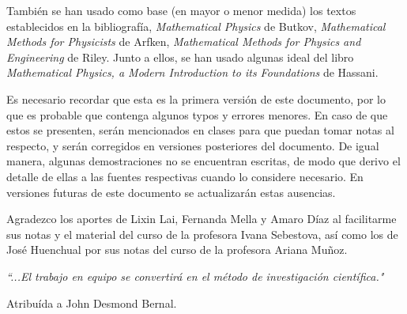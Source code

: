 \documentclass[letterpaper,12pt, twoside]{book}
\theoremstyle{definition}
\begin{document}
También se han usado como base (en mayor o menor medida) los textos establecidos en la bibliografía, \emph{Mathematical Physics} de Butkov, \emph{Mathematical Methods for Physicists} de Arfken, \emph{Mathematical Methods for Physics and Engineering} de Riley. Junto a ellos, se han usado algunas ideal del libro \emph{Mathematical Physics, a Modern Introduction to its Foundations} de Hassani.

Es necesario recordar que esta es la primera versión de este documento, por lo que es probable que contenga algunos typos y errores menores. En caso de que estos se presenten, serán mencionados en clases para que puedan tomar notas al respecto, y serán corregidos en versiones posteriores del documento. De igual manera, algunas demostraciones no se encuentran escritas, de modo que derivo el detalle de ellas a las fuentes respectivas cuando lo considere necesario. En versiones futuras de este documento se actualizarán estas ausencias.


Agradezco los aportes de Lixin Lai, Fernanda Mella y Amaro Díaz al facilitarme sus notas y el material del curso de la profesora Ivana Sebestova, así como los de José Huenchual por sus notas del curso de la profesora Ariana Muñoz.

\vfill

\emph{\textquotedblleft ...El trabajo en equipo se convertirá en el método de investigación científica."}

\begin{flushright}
Atribuída a John Desmond Bernal.
\end{flushright}



\tableofcontents

\mainmatter

\pagestyle{fancy}











\appendix

% 
% 

\backmatter

\nocite{*} %
\setcounter{chapter}{0}

\printbibliography[heading=bibintoc, title=Referencias]
\end{document}
